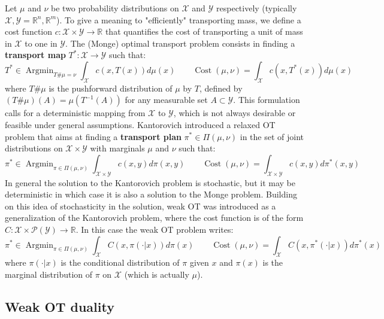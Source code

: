 \documentclass[11pt]{article}
\newcommand{\R}{\mathbb{R}}
\DeclareMathOperator*{\Argmin}{\text{Argmin}}
\DeclareMathOperator*{\Cost}{\text{Cost}}
\begin{document}
Let $\mu$ and $\nu$ be two probability distributions on $\mathcal{X}$ and $\mathcal{Y}$ respectively (typically $\mathcal{X}, \mathcal{Y}=\R^n,\R^m$). To give a meaning to "efficiently" transporting mass, we define a cost function $c:\mathcal{X}\times\mathcal{Y}\to\R$ that quantifies the cost of transporting a unit of mass in $\mathcal{X}$ to one in $\mathcal{Y}$. The (Monge) optimal transport problem consists in finding a \textbf{transport map} $T^*:\mathcal{X}\to \mathcal{Y}$ such that:
\begin{equation}
    T^* \in \Argmin_{T\#\mu=\nu} \int_{\mathcal{X}} c(x,T(x))d\mu(x) \quad\quad \Cost(\mu,\nu) = \int_{\mathcal{X}} c(x,T^*(x))d\mu(x)
\end{equation}
where $T\#\mu$ is the pushforward distribution of $\mu$ by $T$, defined by $(T\#\mu)(A)=\mu(T^{-1}(A))$ for any measurable set $A\subset\mathcal{Y}$. This formulation calls for a deterministic mapping from $\mathcal{X}$ to $\mathcal{Y}$, which is not always desirable or feasible under general assumptions. Kantorovich introduced  a relaxed OT problem that aims at finding a \textbf{transport plan} $\pi^*\in \Pi(\mu,\nu)$ in the set of joint distributions on $\mathcal{X}\times\mathcal{Y}$ with marginals $\mu$ and $\nu$ such that:
\begin{equation}
    \pi^* \in \Argmin_{\pi\in\Pi(\mu,\nu)} \int_{\mathcal{X}\times\mathcal{Y}} c(x,y)d\pi(x,y) \quad\quad \Cost(\mu,\nu) = \int_{\mathcal{X}\times\mathcal{Y}} c(x,y)d\pi^*(x,y)
\end{equation}
In general the solution to the Kantorovich problem is stochastic, but it may be deterministic in which case it is also a solution to the Monge problem. Building on this idea of stochasticity in the solution, weak OT was introduced as a generalization of the Kantorovich problem, where the cost function is of the form $C: \mathcal{X}\times \mathcal{P}(\mathcal{Y})\to\R$. In this case the weak OT problem writes:
\begin{equation}
    \pi^* \in \Argmin_{\pi\in\Pi(\mu,\nu)} \int_{\mathcal{X}} C(x,\pi(\cdot|x))d\pi(x) \quad\quad \Cost(\mu,\nu) = \int_{\mathcal{X}} C(x,\pi^*(\cdot|x))d\pi^*(x)
\end{equation}
where $\pi(\cdot|x)$ is the conditional distribution of $\pi$ given $x$ and $\pi(x)$ is the marginal distribution of $\pi$ on $\mathcal{X}$ (which is actually $\mu$).

\subsection{Weak OT duality}
\end{document}
